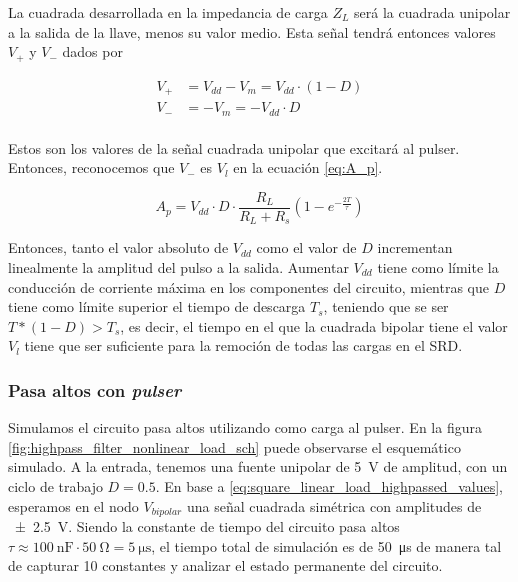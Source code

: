 La cuadrada desarrollada en la impedancia de carga $Z_L$ será la cuadrada
unipolar a la salida de la llave, menos su valor medio. Esta señal tendrá
entonces valores $V_+$ y $V_-$ dados por

\begin{equation}
    \label{eq:square_linear_load_highpassed_values}
    \begin{aligned}
        V_+ &= V_{dd}-V_m = V_{dd} \cdot (1-D) \\
        V_- &= -V_m = -V_{dd} \cdot D \\
    \end{aligned}
\end{equation}

Estos son los valores de la señal cuadrada unipolar que excitará al pulser.
Entonces, reconocemos que $V_-$ es $V_l$ en la ecuación \ref{eq:A_p}.

\begin{equation}
    A_p = V_{dd} \cdot D \cdot \frac{R_L}{R_L+R_s} \left( 1-e^{-\frac{2T}{\tau}}\right)
\end{equation}

Entonces, tanto el valor absoluto de $V_{dd}$ como el valor de $D$ incrementan
linealmente la amplitud del pulso a la salida. Aumentar $V_{dd}$ tiene como
límite la conducción de corriente máxima en los componentes del circuito,
mientras que $D$ tiene como límite superior el tiempo de descarga $T_s$,
teniendo que se ser $T*(1-D) > T_s$, es decir, el tiempo en el que la cuadrada
bipolar tiene el valor $V_l$ tiene que ser suficiente para la remoción de todas
las cargas en el SRD.

\subsubsection{Pasa altos con \textit{pulser}}
\label{sec:carga_no_lineal}

Simulamos el circuito pasa altos utilizando como carga al pulser. En la figura
\ref{fig:highpass_filter_nonlinear_load_sch} puede observarse el esquemático
simulado. A la entrada, tenemos una fuente unipolar de \qty{5}{\volt} de
amplitud, con un ciclo de trabajo $D=0.5$. En base a
\ref{eq:square_linear_load_highpassed_values}, esperamos en el nodo
$V_{bipolar}$ una señal cuadrada simétrica con amplitudes de
\qty{\pm2.5}{\volt}. Siendo la constante de tiempo del circuito pasa altos $\tau
\approx \qty{100}{\nano\farad} \cdot \qty{50}{\ohm} = \qty{5}{\micro\second}$,
el tiempo total de simulación es de \qty{50}{\micro\second} de manera tal de
capturar 10 constantes y analizar el estado permanente del circuito.

